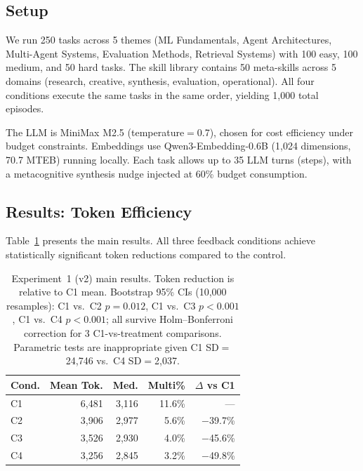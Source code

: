 
\subsection{Setup}

We run 250 tasks across 5 themes (ML Fundamentals, Agent Architectures, Multi-Agent Systems, Evaluation Methods, Retrieval Systems) with 100 easy, 100 medium, and 50 hard tasks.
The skill library contains 50 meta-skills across 5 domains (research, creative, synthesis, evaluation, operational).
All four conditions execute the same tasks in the same order, yielding 1,000 total episodes.

The LLM is MiniMax M2.5 (temperature${=}$0.7), chosen for cost efficiency under budget constraints.
Embeddings use Qwen3-Embedding-0.6B (1,024 dimensions, 70.7 MTEB) running locally.
Each task allows up to 35 LLM turns (steps), with a metacognitive synthesis nudge injected at 60\% budget consumption.

\subsection{Results: Token Efficiency}

Table~\ref{tab:v2_results} presents the main results.
All three feedback conditions achieve statistically significant token reductions compared to the control.

\begin{table}[t]
\centering
\small
\begin{tabular}{lrrrr}
\toprule
\textbf{Cond.} & \textbf{Mean Tok.} & \textbf{Med.} & \textbf{Multi\%} & \textbf{$\Delta$ vs C1} \\
\midrule
C1 & 6,481 & 3,116 & 11.6\% & --- \\
C2 & 3,906 & 2,977 & 5.6\% & $-$39.7\% \\
C3 & 3,526 & 2,930 & 4.0\% & $-$45.6\% \\
C4 & 3,256 & 2,845 & 3.2\% & $-$49.8\% \\
\bottomrule
\end{tabular}
\caption{Experiment~1 (v2) main results. Token reduction is relative to C1 mean. Bootstrap 95\% CIs (10,000 resamples): C1 vs.\ C2 $p=0.012$, C1 vs.\ C3 $p<0.001$, C1 vs.\ C4 $p<0.001$; all survive Holm--Bonferroni correction for 3 C1-vs-treatment comparisons. Parametric tests are inappropriate given C1 SD$=$24{,}746 vs.\ C4 SD$=$2{,}037.}
\label{tab:v2_results}
\end{table}

